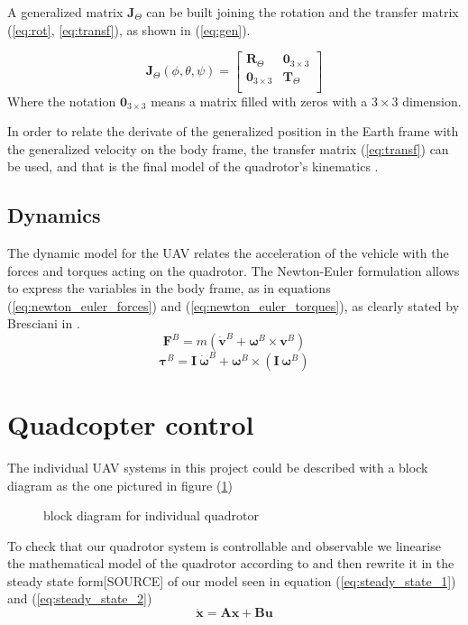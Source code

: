 \documentclass[journal]{IEEEtran}
\begin{document}
	A generalized matrix $\bm{J}_\Theta$ can be built joining the rotation and the transfer matrix (\ref{eq:rot}, \ref{eq:transf}), as shown in (\ref{eq:gen}).
	
	\begin{equation} \label{eq:gen}
	\bm{J}_\Theta (\phi,\theta, \psi)= \left[ {\begin{array}{cc}
		\bm{R}_\Theta &  \mathbf{0}_{3\times 3} \\
		\mathbf{0}_{3\times 3} & \bm{T}_\Theta \\
		\end{array} } \right]
	\end{equation}  
	Where the notation $\mathbf{0}_{3\times 3}$ means a matrix filled with zeros with a $3 \times 3$ dimension.
	
	In order to relate the derivate of the generalized position in the Earth frame with the generalized velocity on the body frame, the transfer matrix (\ref{eq:transf}) can be used, and that is the final model of the quadrotor's kinematics \cite{SabatinoFrancesco2015Qcmn, mod_control_bresciani}.
	
	\subsection{Dynamics}
	The dynamic model for the UAV relates the acceleration of the vehicle with the forces and torques acting on the quadrotor. The Newton-Euler formulation allows to express the variables in the body frame, as in equations (\ref{eq:newton_euler_forces}) and (\ref{eq:newton_euler_torques}), as clearly stated by Bresciani in \cite{mod_control_bresciani}.
	\begin{equation} \label{eq:newton_euler_forces}
	\bm{F}^B = m ( \bm{\dot v}^B + \bm{\omega}^B \times \bm{v}^B)
	\end{equation}
	\begin{equation} \label{eq:newton_euler_torques}
	\bm{\tau}^B = \bm{I} \ \bm{\dot \omega}^B + \bm{\omega}^B \times (\bm{I} \ \bm{\omega}^B)
	\end{equation}
	
	\section{Quadcopter control}
	The individual UAV systems in this project could be described with a block diagram as the one pictured in figure (\ref{fig:block_diagram})
	\begin{figure}[h]
		\centering
		
		\caption{block diagram for individual quadrotor}
		\label{fig:block_diagram}
	\end{figure}	
	To check that our quadrotor system is controllable and observable we linearise the mathematical model of the quadrotor according to \cite{SabatinoFrancesco2015Qcmn} and then rewrite it in the steady state form[SOURCE] of our model seen in equation (\ref{eq:steady_state_1}) and (\ref{eq:steady_state_2})
	\begin{equation} \label{eq:steady_state_1}
			\bm{\dot x} = \bm{A} \bm{x} + \bm{B} \bm{u}
	\end{equation}
	
\end{document}
